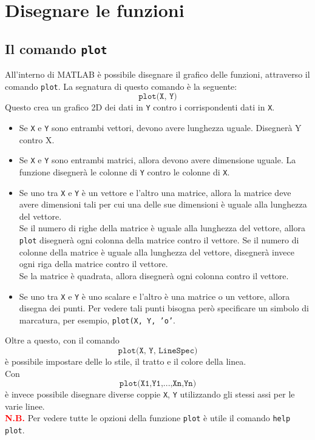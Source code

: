 \chapter{Disegnare le funzioni}
\section{Il comando \texttt{plot}}
All'interno di MATLAB è possibile disegnare il grafico delle funzioni, attraverso il comando \texttt{plot}.
La segnatura di questo comando è la seguente:
$$ \texttt{plot(X, Y)} $$
Questo crea un grafico 2D dei dati in \texttt{Y} contro i corrispondenti dati in \texttt{X}.
\begin{itemize}
	\item 	Se \texttt{X} e \texttt{Y} sono entrambi vettori, devono avere lunghezza uguale. Disegnerà Y contro X.
	\item	Se \texttt{X} e \texttt{Y} sono entrambi matrici, allora devono avere dimensione uguale. La funzione
			disegnerà le colonne di \texttt{Y} contro le colonne di \texttt{X}.
	\item	Se uno tra \texttt{X} e \texttt{Y} è un vettore e l'altro una matrice, allora la matrice deve avere
			dimensioni tali per cui una delle sue dimensioni è uguale alla lunghezza del vettore. \\
			Se il numero di righe della matrice è uguale alla lunghezza del vettore, allora \texttt{plot} 
			disegnerà ogni colonna della matrice contro il vettore. Se il numero di colonne della matrice è uguale
			alla lunghezza del vettore, disegnerà invece ogni riga della matrice contro il vettore. \\
			Se la matrice è quadrata, allora disegnerà ogni colonna contro il vettore.
	\item	Se uno tra \texttt{X} e \texttt{Y} è uno scalare e l'altro è una matrice o un vettore, allora disegna
			dei punti. Per vedere tali punti bisogna però specificare un simbolo di marcatura, per esempio,
			\texttt{plot(X, Y, 'o'}.
\end{itemize}

Oltre a questo, con il comando $$\texttt{plot(X, Y, LineSpec)}$$ è possibile impostare delle lo stile, il tratto e il 
colore della linea. \break \\
Con $$\texttt{plot(X1,Y1,...,Xn,Yn)}$$ è invece possibile disegnare diverse coppie \texttt{X}, \texttt{Y} utilizzando 
gli stessi assi per le varie linee. \break \\

\textcolor{Red}{\textbf{N.B.}} Per vedere tutte le opzioni della funzione \texttt{plot} è utile il comando \texttt{help 
plot}.